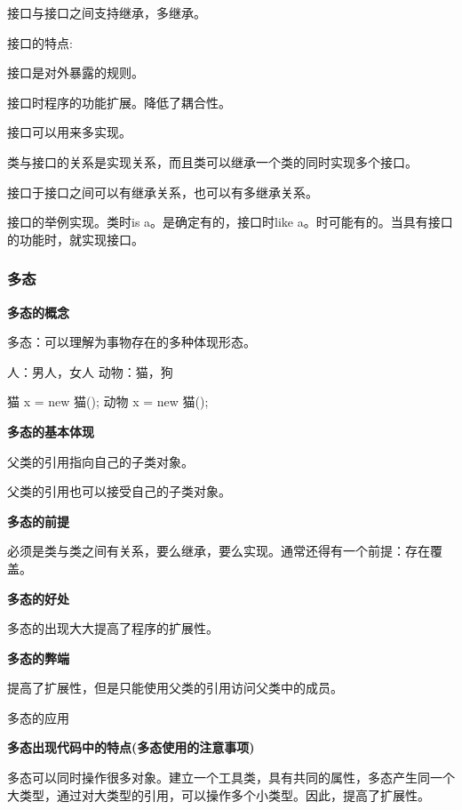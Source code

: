 \documentclass[UTF8]{ctexart}
\begin{document}
接口与接口之间支持继承，多继承。

接口的特点:

\textbullet 接口是对外暴露的规则。

\textbullet 接口时程序的功能扩展。降低了耦合性。

\textbullet 接口可以用来多实现。

\textbullet 类与接口的关系是实现关系，而且类可以继承一个类的同时实现多个接口。

\textbullet 接口于接口之间可以有继承关系，也可以有多继承关系。


接口的举例实现。类时is a。是确定有的，接口时like a。时可能有的。当具有接口的功能时，就实现接口。


\subsubsection{多态}

\textbullet \textbf{多态的概念}
	
多态：可以理解为事物存在的多种体现形态。

人：男人，女人
动物：猫，狗

猫 x = new 猫();
动物 x = new 猫();

\textbullet \textbf{多态的基本体现}
	
\quad 父类的引用指向自己的子类对象。

\quad 父类的引用也可以接受自己的子类对象。

\textbullet \textbf{多态的前提}

\quad 必须是类与类之间有关系，要么继承，要么实现。通常还得有一个前提：存在覆盖。

\textbullet \textbf{多态的好处}

\quad 多态的出现大大提高了程序的扩展性。

\textbullet \textbf{多态的弊端}

\quad 提高了扩展性，但是只能使用父类的引用访问父类中的成员。

\textbullet 多态的应用

\textbullet \textbf{多态出现代码中的特点(多态使用的注意事项)}


多态可以同时操作很多对象。建立一个工具类，具有共同的属性，多态产生同一个大类型，通过对大类型的引用，可以操作多个小类型。因此，提高了扩展性。

\end{document}

